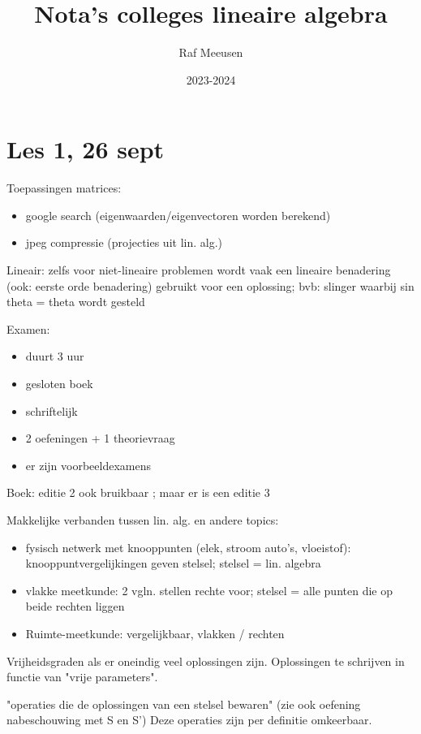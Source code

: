 \documentclass{article}
\title{Nota's colleges lineaire algebra}
\author{Raf Meeusen}
\date{2023-2024}
\begin{document}
\maketitle

\section{Les 1, 26 sept}

Toepassingen matrices: 
\begin{itemize}
\item google search (eigenwaarden/eigenvectoren worden berekend) 
\item jpeg compressie (projecties uit lin. alg.) 
\end{itemize}


Lineair: zelfs voor niet-lineaire problemen wordt vaak een lineaire benadering (ook: eerste orde benadering) gebruikt voor een oplossing; bvb: slinger waarbij sin theta = theta wordt gesteld

Examen: 
\begin{itemize}
\item duurt 3 uur
\item gesloten boek
\item schriftelijk
\item 2 oefeningen + 1 theorievraag
\item er zijn voorbeeldexamens 
\end{itemize}

Boek: editie 2 ook bruikbaar ; maar er is een editie 3 


Makkelijke verbanden tussen lin. alg. en andere topics: 
\begin{itemize}
    \item fysisch netwerk met knooppunten (elek, stroom auto's, vloeistof): knooppuntvergelijkingen geven stelsel; stelsel = lin. algebra
    \item vlakke meetkunde: 2 vgln. stellen rechte voor; stelsel = alle punten die op beide rechten liggen
    \item Ruimte-meetkunde: vergelijkbaar, vlakken / rechten
\end{itemize}

Vrijheidsgraden als er oneindig veel oplossingen zijn. Oplossingen te schrijven in functie van "vrije parameters". 

"operaties die de oplossingen van een stelsel bewaren" 
(zie ook oefening nabeschouwing met S en S') 
Deze operaties zijn per definitie omkeerbaar.  
\end{document}
